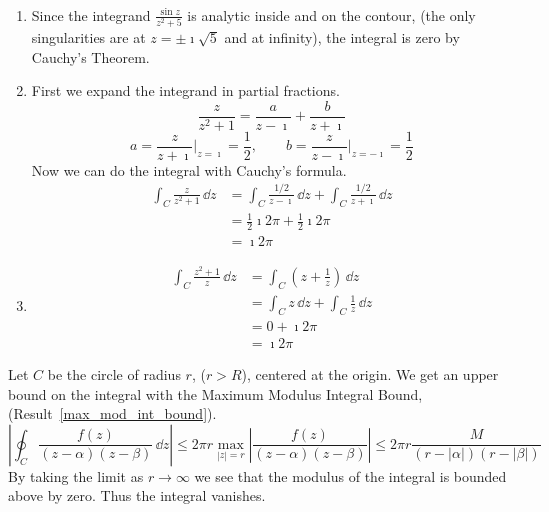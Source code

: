 {%
\begin{Solution}
  $\phantom{a}$
  \begin{enumerate}
  \item
    Since the integrand $\frac{\sin z}{z^2 + 5}$ is analytic inside
    and on the contour, (the only singularities are at $z = \pm \imath \sqrt{5}$ 
    and at infinity), the integral is zero by Cauchy's Theorem.
  \item
    First we expand the integrand in partial fractions.
    \[
    \frac{z}{z^2 + 1} = \frac{a}{z - \imath} + \frac{b}{z + \imath}
    \]
    \[
    a = \frac{z}{z + \imath} \bigg|_{z = \imath} = \frac{1}{2}, \qquad
    b = \frac{z}{z - \imath} \bigg|_{z = -\imath} = \frac{1}{2}
    \]
    Now we can do the integral with Cauchy's formula.
    \begin{align*}
      \int_C \frac{z}{z^2 + 1} \,\dd z
      &= \int_C \frac{1/2}{z - \imath} \,\dd z + \int_C \frac{1/2}{z + \imath} \,\dd z 
      \\
      &= \frac{1}{2} \imath 2 \pi + \frac{1}{2} \imath 2 \pi 
      \\
      &= \imath 2 \pi
    \end{align*}
  \item
    \begin{align*}
      \int_C \frac{z^2 + 1}{z}\,\dd z
      &= \int_C \left( z + \frac{1}{z} \right)\,\dd z 
      \\
      &= \int_C z\,\dd z + \int_C \frac{1}{z}\,\dd z 
      \\
      &= 0 + \imath 2 \pi 
      \\
      &= \imath 2 \pi
    \end{align*}
  \end{enumerate}
\end{Solution}





\begin{Solution}
  Let $C$ be the circle of radius $r$, ($r > R$), centered at the origin.
  We get an upper bound on the integral with the Maximum Modulus 
  Integral Bound, (Result~\ref{max_mod_int_bound}).
  \[
  \left| \oint_C \frac{f(z)}{(z - \alpha) (z - \beta)}\,\dd z \right|
  \leq 2 \pi r \max_{|z| = r} \left| \frac{f(z)}{(z - \alpha) (z - \beta)} \right|
  \leq 2 \pi r \frac{M}{(r - |\alpha|) (r - |\beta|)}
  \]
  By taking the limit as $r \to \infty$ we see that the modulus of the integral is 
  bounded above by zero.  Thus the integral vanishes.


\end{Solution}}
